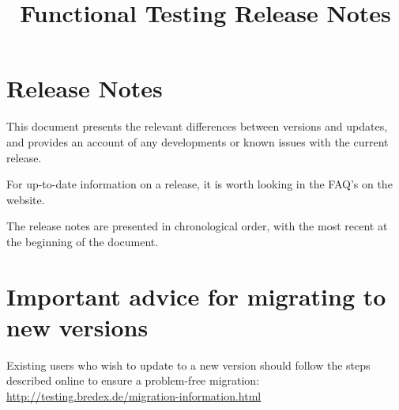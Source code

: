 
\title{Functional Testing Release Notes}
\author*{}{}
\maketitle

\setcounter{secnumdepth}{0}

\clearpage
\section{Release Notes}
This document presents the relevant differences between versions and updates, and provides an account of any developments or known issues with the current release. 

For up-to-date information on a release, it is worth looking in the FAQ's on the website. 

The release notes are presented in chronological order, with the most recent at the beginning of the document.  

\section{Important advice for migrating to new versions}
Existing users who wish to update to a new version should follow the steps described online to ensure a problem-free migration:\\
\url{http://testing.bredex.de/migration-information.html}












